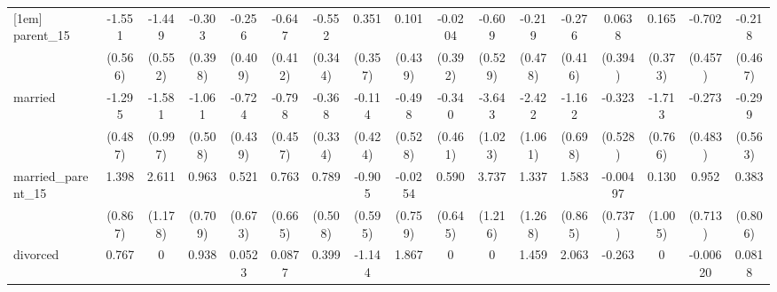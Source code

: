 {\begin{tabular}{l*{16}{c}}
[1em]
parent\_15           &      -1.551\sym{**} &      -1.449\sym{**} &      -0.303         &      -0.256         &      -0.647         &      -0.552         &       0.351         &       0.101         &     -0.0204         &      -0.609         &      -0.219         &      -0.276         &      0.0638         &       0.165         &      -0.702         &      -0.218         \\
                    &     (0.566)         &     (0.552)         &     (0.398)         &     (0.409)         &     (0.412)         &     (0.344)         &     (0.357)         &     (0.439)         &     (0.392)         &     (0.529)         &     (0.478)         &     (0.416)         &     (0.394)         &     (0.373)         &     (0.457)         &     (0.467)         \\
[1em]
married             &      -1.295\sym{**} &      -1.581         &      -1.061\sym{*}  &      -0.724         &      -0.798         &      -0.368         &      -0.114         &      -0.498         &      -0.340         &      -3.643\sym{***}&      -2.422\sym{*}  &      -1.162         &      -0.323         &      -1.713\sym{*}  &      -0.273         &      -0.299         \\
                    &     (0.487)         &     (0.997)         &     (0.508)         &     (0.439)         &     (0.457)         &     (0.334)         &     (0.424)         &     (0.528)         &     (0.461)         &     (1.023)         &     (1.061)         &     (0.698)         &     (0.528)         &     (0.766)         &     (0.483)         &     (0.563)         \\
[1em]
married\_parent\_15   &       1.398         &       2.611\sym{*}  &       0.963         &       0.521         &       0.763         &       0.789         &      -0.905         &     -0.0254         &       0.590         &       3.737\sym{**} &       1.337         &       1.583         &    -0.00497         &       0.130         &       0.952         &       0.383         \\
                    &     (0.867)         &     (1.178)         &     (0.709)         &     (0.673)         &     (0.665)         &     (0.508)         &     (0.595)         &     (0.759)         &     (0.645)         &     (1.216)         &     (1.268)         &     (0.865)         &     (0.737)         &     (1.005)         &     (0.713)         &     (0.806)         \\
[1em]
divorced            &       0.767         &           0         &       0.938         &      0.0523         &      0.0877         &       0.399         &      -1.144         &       1.867\sym{***}&           0         &           0         &       1.459\sym{*}  &       2.063\sym{**} &      -0.263         &           0         &    -0.00620         &      0.0818         \\

\end{tabular}}
